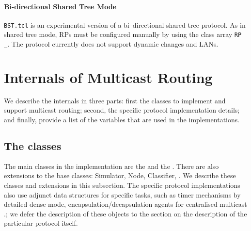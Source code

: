 \paragraph{Bi-directional Shared Tree Mode}
{\tt BST.tcl} is an experimental version of a bi--directional shared
tree protocol.  As in shared tree mode, RPs must be configured
manually by using the class array {\tt RP\\_}.  The protocol currently
does not support dynamic changes and LANs.

\section{Internals of Multicast Routing}
\label{sec:mcast-internals}

We describe the internals in three parts: first the classes to
implement and support multicast routing; second, the specific protocol
implementation details; and finally, provide a list of the variables
that are used in the implementations.

\subsection{The classes}
The main classes in the implementation are the
 and the
.  There are
also extensions to the base classes: Simulator, Node, Classifier,
\etc.  We describe these classes and extensions in this subsection.
The specific protocol implementations also use adjunct data structures
for specific tasks, such as timer mechanisms by detailed dense mode,
encapsulation/decapsulation agents for centralised multicast \etc.; we
defer the description of these objects to the section on the
description of the particular protocol itself.

